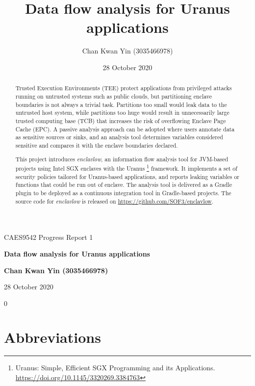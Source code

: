 \documentclass[a4paper, 12pt]{article}
\title{Data flow analysis for Uranus applications}
\author{Chan Kwan Yin (3035466978)}
\date{28 October 2020}
\def\pname{\emph{enclavlow}}
\begin{document}
\begin{titlepage}
	\begin{center}
		\vspace*{2em}
		\LARGE
		CAES9542 Progress Report 1

		\vspace*{1em}
		\Huge
		\textbf{Data flow analysis for Uranus applications}

		\Large
		\vspace{1.5em}
		\textbf{Chan Kwan Yin (3035466978)}

		\vspace{0.5em}
		28 October 2020
	\end{center}
\end{titlepage}

\thispagestyle{empty}
\begin{abstract}
	Trusted Execution Environments (TEE) protect applications from privileged attacks
	running on untrusted systems such as public clouds,
	but partitioning enclave boundaries is not always a trivial task.
	Partitions too small would leak data to the untrusted host system,
	while partitions too huge would result in unnecessarily large trusted computing base (TCB)
	that increases the risk of overflowing Enclave Page Cache (EPC).
	A passive analysis approach can be adopted where
	users annotate data as sensitive sources or sinks,
	and an analysis tool determines variables considered sensitive
	and compares it with the enclave boundaries declared.

	This project introduces \pname{}, an information flow analysis tool
	for JVM-based projects using Intel SGX enclaves with the Uranus
	\footnote{ Uranus: Simple, Efficient SGX Programming and its Applications.
	\url{https://doi.org/10.1145/3320269.3384763}
	} framework.
	It implements a set of security policies tailored for Uranus-based applications,
	and reports leaking variables or functions that could be run out of enclave.
	The analysis tool is delivered as a Gradle plugin
	to be deployed as a continuous integration tool in Gradle-based projects.
	The source code for \pname{} is released on \url{https://github.com/SOF3/enclavlow}.
\end{abstract}
\newpage

\thispagestyle{empty}
\tableofcontents
\listoffigures
\listoftables
\lstlistoflistings

\setcounter{page}0
\newpage

\section{Abbreviations}
\end{document}
